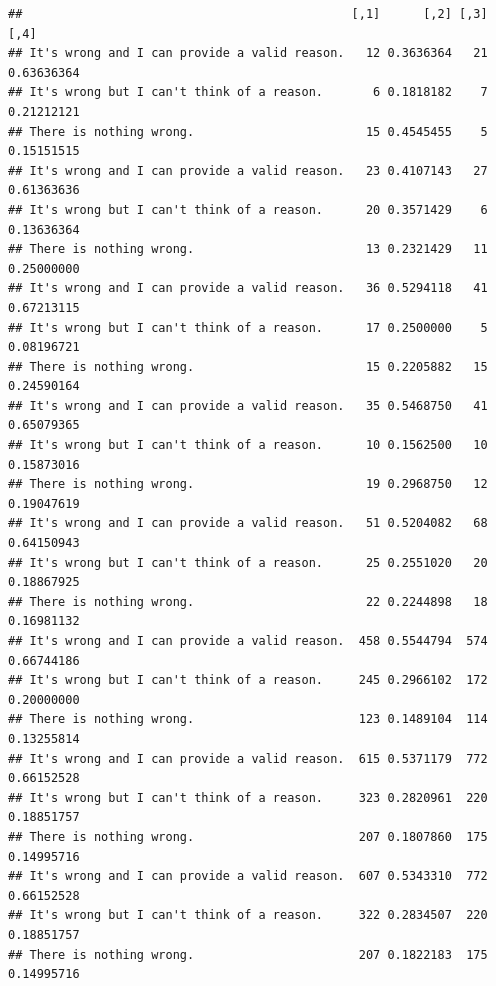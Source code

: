\documentclass[
  american,
  man,floatsintext]{apa7}
\begin{document}
\begin{verbatim}
##                                              [,1]      [,2] [,3]       [,4]
## It's wrong and I can provide a valid reason.   12 0.3636364   21 0.63636364
## It's wrong but I can't think of a reason.       6 0.1818182    7 0.21212121
## There is nothing wrong.                        15 0.4545455    5 0.15151515
## It's wrong and I can provide a valid reason.   23 0.4107143   27 0.61363636
## It's wrong but I can't think of a reason.      20 0.3571429    6 0.13636364
## There is nothing wrong.                        13 0.2321429   11 0.25000000
## It's wrong and I can provide a valid reason.   36 0.5294118   41 0.67213115
## It's wrong but I can't think of a reason.      17 0.2500000    5 0.08196721
## There is nothing wrong.                        15 0.2205882   15 0.24590164
## It's wrong and I can provide a valid reason.   35 0.5468750   41 0.65079365
## It's wrong but I can't think of a reason.      10 0.1562500   10 0.15873016
## There is nothing wrong.                        19 0.2968750   12 0.19047619
## It's wrong and I can provide a valid reason.   51 0.5204082   68 0.64150943
## It's wrong but I can't think of a reason.      25 0.2551020   20 0.18867925
## There is nothing wrong.                        22 0.2244898   18 0.16981132
## It's wrong and I can provide a valid reason.  458 0.5544794  574 0.66744186
## It's wrong but I can't think of a reason.     245 0.2966102  172 0.20000000
## There is nothing wrong.                       123 0.1489104  114 0.13255814
## It's wrong and I can provide a valid reason.  615 0.5371179  772 0.66152528
## It's wrong but I can't think of a reason.     323 0.2820961  220 0.18851757
## There is nothing wrong.                       207 0.1807860  175 0.14995716
## It's wrong and I can provide a valid reason.  607 0.5343310  772 0.66152528
## It's wrong but I can't think of a reason.     322 0.2834507  220 0.18851757
## There is nothing wrong.                       207 0.1822183  175 0.14995716
\end{verbatim}
\end{document}
